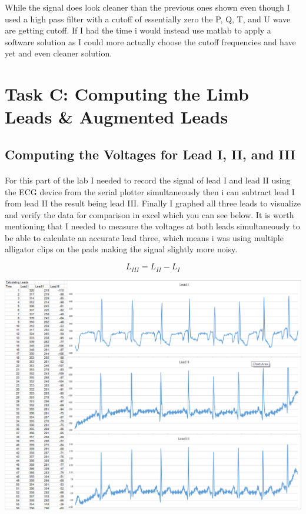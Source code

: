 \documentclass[12pt]{article}
\begin{document}
				While the signal does look cleaner than the previous ones shown even though I used a high pass filter with a cutoff of essentially
				zero the P, Q, T, and U wave are getting cutoff. If I had the time i would instead use matlab to apply a software solution as I could
				more actually choose the cutoff frequencies and have yet and even cleaner solution.
				
	\section{Task C: Computing the Limb Leads \& Augmented Leads}
		\subsection{Computing the Voltages for Lead I, II, and III}
			\paragraph{}
				For this part of the lab I needed to record the signal of lead I and lead II using the ECG device from the serial plotter simultaneously
				then i can subtract lead I from lead II the result being lead III. Finally I graphed all three leads to visualize and verify the data for 
				comparison in excel which you can see below. It is worth mentioning that I needed to measure the voltages at both leads simultaneously
				to be able to calculate an accurate lead three, which means i was using multiple alligator clips on the pads making the signal slightly more
				noisy.

				\begin{equation}
					L_{III} = L_{II} - L_I
				\end{equation}

				\begin{center}
					\includegraphics[scale=0.28]{3leads.PNG}\\
				\end{center}
\end{document}
